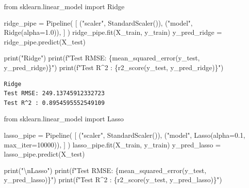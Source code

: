 \documentclass[
  letterpaper,
  DIV=11,
  numbers=noendperiod]{scrreprt}
\newenvironment{Shaded}{\begin{snugshade}}{\end{snugshade}}
\newcommand{\BuiltInTok}[1]{\textcolor[rgb]{0.00,0.23,0.31}{#1}}
\newcommand{\CharTok}[1]{\textcolor[rgb]{0.13,0.47,0.30}{#1}}
\newcommand{\DecValTok}[1]{\textcolor[rgb]{0.68,0.00,0.00}{#1}}
\newcommand{\FloatTok}[1]{\textcolor[rgb]{0.68,0.00,0.00}{#1}}
\newcommand{\ImportTok}[1]{\textcolor[rgb]{0.00,0.46,0.62}{#1}}
\newcommand{\NormalTok}[1]{\textcolor[rgb]{0.00,0.23,0.31}{#1}}
\newcommand{\OperatorTok}[1]{\textcolor[rgb]{0.37,0.37,0.37}{#1}}
\newcommand{\SpecialCharTok}[1]{\textcolor[rgb]{0.37,0.37,0.37}{#1}}
\newcommand{\SpecialStringTok}[1]{\textcolor[rgb]{0.13,0.47,0.30}{#1}}
\newcommand{\StringTok}[1]{\textcolor[rgb]{0.13,0.47,0.30}{#1}}
\theoremstyle{definition}
\theoremstyle{definition}
\theoremstyle{plain}
\theoremstyle{plain}
\theoremstyle{remark}
\begin{document}
\begin{Shaded}
\begin{Highlighting}[]
\ImportTok{from}\NormalTok{ sklearn.linear\_model }\ImportTok{import}\NormalTok{ Ridge}

\NormalTok{ridge\_pipe }\OperatorTok{=}\NormalTok{ Pipeline(}
\NormalTok{    [}
\NormalTok{        (}\StringTok{"scaler"}\NormalTok{, StandardScaler()),}
\NormalTok{        (}\StringTok{"model"}\NormalTok{, Ridge(alpha}\OperatorTok{=}\FloatTok{1.0}\NormalTok{)),}
\NormalTok{    ]}
\NormalTok{)}
\NormalTok{ridge\_pipe.fit(X\_train, y\_train)}
\NormalTok{y\_pred\_ridge }\OperatorTok{=}\NormalTok{ ridge\_pipe.predict(X\_test)}

\BuiltInTok{print}\NormalTok{(}\StringTok{"Ridge"}\NormalTok{)}
\BuiltInTok{print}\NormalTok{(}\SpecialStringTok{f"Test RMSE: }\SpecialCharTok{\{}\NormalTok{mean\_squared\_error(y\_test, y\_pred\_ridge)}\SpecialCharTok{\}}\SpecialStringTok{"}\NormalTok{)}
\BuiltInTok{print}\NormalTok{(}\SpecialStringTok{f"Test R\^{}2 : }\SpecialCharTok{\{}\NormalTok{r2\_score(y\_test, y\_pred\_ridge)}\SpecialCharTok{\}}\SpecialStringTok{"}\NormalTok{)}
\end{Highlighting}
\end{Shaded}

\begin{verbatim}
Ridge
Test RMSE: 249.13745912332723
Test R^2 : 0.8954595552549109
\end{verbatim}

\begin{Shaded}
\begin{Highlighting}[]
\ImportTok{from}\NormalTok{ sklearn.linear\_model }\ImportTok{import}\NormalTok{ Lasso}

\NormalTok{lasso\_pipe }\OperatorTok{=}\NormalTok{ Pipeline(}
\NormalTok{    [}
\NormalTok{        (}\StringTok{"scaler"}\NormalTok{, StandardScaler()),}
\NormalTok{        (}\StringTok{"model"}\NormalTok{, Lasso(alpha}\OperatorTok{=}\FloatTok{0.1}\NormalTok{, max\_iter}\OperatorTok{=}\DecValTok{10000}\NormalTok{)),}
\NormalTok{    ]}
\NormalTok{)}
\NormalTok{lasso\_pipe.fit(X\_train, y\_train)}
\NormalTok{y\_pred\_lasso }\OperatorTok{=}\NormalTok{ lasso\_pipe.predict(X\_test)}

\BuiltInTok{print}\NormalTok{(}\StringTok{"}\CharTok{\textbackslash{}n}\StringTok{Lasso"}\NormalTok{)}
\BuiltInTok{print}\NormalTok{(}\SpecialStringTok{f"Test RMSE: }\SpecialCharTok{\{}\NormalTok{mean\_squared\_error(y\_test, y\_pred\_lasso)}\SpecialCharTok{\}}\SpecialStringTok{"}\NormalTok{)}
\BuiltInTok{print}\NormalTok{(}\SpecialStringTok{f"Test R\^{}2 : }\SpecialCharTok{\{}\NormalTok{r2\_score(y\_test, y\_pred\_lasso)}\SpecialCharTok{\}}\SpecialStringTok{"}\NormalTok{)}
\end{Highlighting}
\end{Shaded}
\end{document}
